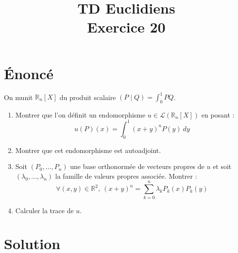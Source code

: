 \documentclass[french]{article}
\title{TD Euclidiens\\ Exercice 20}
\date{}
\newcommand{\R}{\mathbb{R}}
\begin{document}
\maketitle

\section{Énoncé}
On munit $\R_n[X]$ du produit scalaire $(P\mid Q)=\displaystyle\int_{0}^{1}PQ$.
\begin{enumerate}
	\item Montrer que l'on définit un endomorphisme $u\in\mathcal{L}(\R_n[X])$ en posant : $$u(P)(x)=\int_{0}^{1}(x+y)^nP(y)\ dy$$
	\item Montrer que cet endomorphisme est autoadjoint.
	\item Soit $(P_0,\ldots,P_n)$ une base orthonormée de vecteurs propres de $u$ et soit $(\lambda_0,\ldots,\lambda_n)$ la famille de valeurs propres associée. Montrer : $$\forall (x,y)\in\R^2,\ (x+y)^n=\sum_{k=0}^{n}\lambda_kP_k(x)P_k(y)$$
	\item Calculer la trace de $u$.
\end{enumerate}
\section{Solution}
\end{document}
